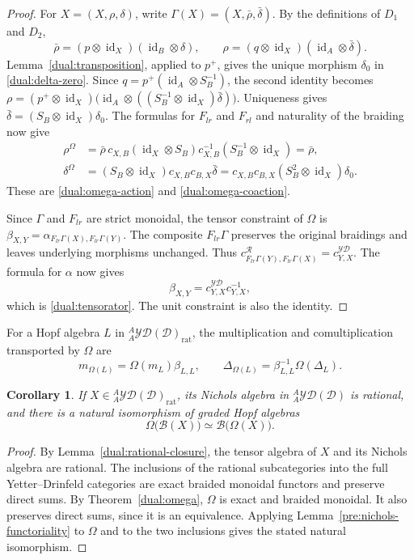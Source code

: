 \documentclass[11pt, a4paper]{article}
\numberwithin{equation}{section}
\newcommand{\D}{\mathcal D}
\newcommand{\B}{\mathcal B}
\newcommand{\YD}{\mathcal{YD}}
\DeclareMathOperator{\id}{id}
\newcommand{\rat}{\mathrm{rat}}
\newtheorem{corollary}[theorem]{Corollary}
\begin{document}
\begin{proof}
For $X=(X,\rho,\delta)$, write
$\Gamma(X)=(X,\bar\rho,\bar\delta)$.
By the definitions of $D_1$ and $D_2$,
\[
 \bar\rho=(p\otimes\id_X)(\id_B\otimes\delta),
 \qquad
 \rho=(q\otimes\id_X)(\id_A\otimes\bar\delta).
\]
Lemma~\ref{dual:transposition}, applied to $p^+$, gives the
unique morphism $\delta_0$ in \eqref{dual:delta-zero}.
Since $q=p^+(\id_A\otimes S_B^{-1})$, the second identity becomes
$
 \rho=(p^+\otimes\id_X)
\bigl(\id_A\otimes((S_B^{-1}\otimes\id_X)\bar\delta)\bigr).
$
Uniqueness gives $\bar\delta=(S_B\otimes\id_X)\delta_0$.
The formulas for $F_{lr}$ and $F_{rl}$ and naturality of the
braiding now give
\begin{align*}
 \rho^\Omega
 &=\bar\rho\,c_{X,B}(\id_X\otimes S_B)
       c_{X,B}^{-1}(S_B^{-1}\otimes\id_X)
 =\bar\rho,\\
 \delta^\Omega
 &=(S_B\otimes\id_X)c_{X,B}c_{B,X}\bar\delta
 =c_{X,B}c_{B,X}(S_B^2\otimes\id_X)\delta_0.
\end{align*}
These are \eqref{dual:omega-action}
and \eqref{dual:omega-coaction}.

Since $\Gamma$ and $F_{lr}$ are strict monoidal,
the tensor constraint of $\Omega$ is
$
 \beta_{X,Y}
 =\alpha_{F_{lr}\Gamma(X),F_{lr}\Gamma(Y)}.
$
The composite $F_{lr}\Gamma$ preserves the original
braidings and leaves underlying morphisms unchanged.
Thus
$
 c^{\mathcal R}_{F_{lr}\Gamma(Y),F_{lr}\Gamma(X)}
 =c^{\YD}_{Y,X}.
$
The formula for $\alpha$ now gives
\[
 \beta_{X,Y}=c^{\YD}_{Y,X}c_{Y,X}^{-1},
\]
which is \eqref{dual:tensorator}.
The unit constraint is also the identity.
\end{proof}

For a Hopf algebra $L$ in ${}_A^A\YD(\D)_{\rat}$, the multiplication
and comultiplication transported by $\Omega$ are
\[
m_{\Omega(L)}=\Omega(m_L)\beta_{L,L},
 \qquad
 \Delta_{\Omega(L)}=\beta_{L,L}^{-1}\Omega(\Delta_L).
\]

\begin{corollary}\label{dual:nichols}
If $X\in{}_A^A\YD(\D)_{\rat}$, its Nichols algebra in
${}_A^A\YD(\D)$ is rational, and there is a natural isomorphism of
graded Hopf algebras
\[
 \Omega\bigl(\B(X)\bigr)
   \simeq\B\bigl(\Omega(X)\bigr).
\]
\end{corollary}

\begin{proof}

By Lemma~\ref{dual:rational-closure}, the tensor algebra
of $X$ and its Nichols algebra are rational.
The inclusions of the rational subcategories into the full
Yetter--Drinfeld categories are exact braided monoidal
functors and preserve direct sums.
By Theorem~\ref{dual:omega}, $\Omega$ is exact and braided
monoidal. It also preserves direct sums, since it is an
equivalence.
Applying Lemma~\ref{pre:nichols-functoriality} to $\Omega$
and to the two inclusions gives the stated natural
isomorphism.
\end{proof}
\end{document}
